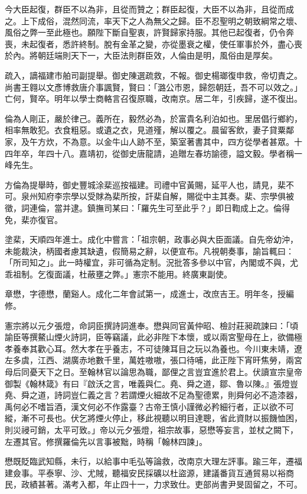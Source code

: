 \begin{pinyinscope}
今大臣起復，群臣不以為非，且從而贊之；群臣起復，大臣不以為非，且從而成之。上下成俗，混然同流，率天下之人為無父之歸。臣不忍聖明之朝致綱常之壞、風俗之弊一至此極也。願陛下斷自聖衷，許賢歸家持服。其他已起復者，仍令奔喪，未起復者，悉許終制。脫有金革之變，亦從墨衰之權，使任軍事於外，盡心喪於內。將朝廷端則天下一，大臣法則群臣效，人倫由是明，風俗由是厚矣。

疏入，謫福建市舶司副提舉。御史陳選疏救，不報。御史楊瑯復申救，帝切責之。尚書王翱以文彥博救唐介事諷賢，賢曰：「潞公市恩，歸怨朝廷，吾不可以效之。」亡何，賢卒。明年以學士商輅言召復原職，改南京。居二年，引疾歸，遂不復出。

倫為人剛正，嚴於律己。義所在，毅然必為，於富貴名利泊如也。里居倡行鄉約，相率無敢犯。衣食粗惡。或遺之衣，見道殣，解以覆之。晨留客飲，妻子貸粟鄰家，及午方炊，不為意。以金牛山人跡不至，築室著書其中，四方從學者甚眾。十四年卒，年四十八。嘉靖初，從御史唐龍請，追贈左春坊諭德，謚文毅。學者稱一峰先生。

方倫為提舉時，御史豐城涂棐巡按福建。司禮中官黃賜，延平人也，請見，棐不可。泉州知府李宗學以受賕為棐所按，訐棐自解，賜從中主其奏。棐、宗學俱被徵，詞連倫，當并逮。鎮撫司某曰：「羅先生可至此乎？」即日鞫成上之。倫得免，棐亦復官。

塗棐，天順四年進士。成化中嘗言：「祖宗朝，政事必與大臣面議。自先帝幼沖，未能裁決，柄國者慮其缺遺，假簡易之辭，以便宣布。凡視朝奏事，諭旨輒曰：「所司知之」。此一時權宜，非可循為定制。況批答多參以中官，內閣或不與，尤乖祖制。乞復面議，杜蔽壅之弊。」憲宗不能用。終廣東副使。

章懋，字德懋，蘭谿人。成化二年會試第一，成進士，改庶吉王。明年冬，授編修。

憲宗將以元夕張燈，命詞臣撰詩詞進奉。懋與同官黃仲昭、檢討莊昶疏諫曰：「頃諭臣等撰鰲山煙火詩詞，臣等竊議，此必非陛下本懷，或以兩宮聖母在上，欲備極孝養奉其歡心耳。然大孝在乎養志，不可徒陳耳目之玩以為養也。今川東未靖，遼左多虞，江西、湖廣赤地數千里，萬姓嗷嗷，張口待哺，此正陛下宵旰焦勞，兩宮母后同憂天下之日。至翰林官以論思為職，鄙俚之言豈宜進於君上。伏讀宣宗皇帝御製《翰林箴》有曰『啟沃之言，唯義與仁。堯、舜之道，鄒、魯以陳。』張燈豈堯、舜之道，詩詞豈仁義之言？若謂煙火細故不足為聖德累，則舜何必不造漆器，禹何必不嗜旨酒，漢文何必不作露臺？古帝王慎小謹微必矜細行者，正以欲不可縱，漸不可長也。伏乞將煙火停止，移此視聽以明目達聰，省此資財以振饑恤困，則災祲可銷，太平可致。」帝以元夕張燈，祖宗故事，惡懋等妄言，並杖之闕下，左遷其官。修撰羅倫先以言事被黜，時稱「翰林四諫」。

懋既貶臨武知縣，未行，以給事中毛弘等論救，改南京大理左評事。踰三年，遷福建僉事。平泰寧、沙、尤賊，聽福安民採礦以杜盜源，建議番貨互通貿易以裕商民，政績甚著。滿考入都，年止四十一，力求致仕。吏部尚書尹旻固留之，不可。


\end{pinyinscope}
